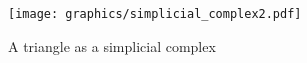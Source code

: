 
\begin{figure}[h]
\centering
\texttt{[image: graphics/simplicial\_complex2.pdf]}
\caption{A triangle as a simplicial complex}
\end{figure}





